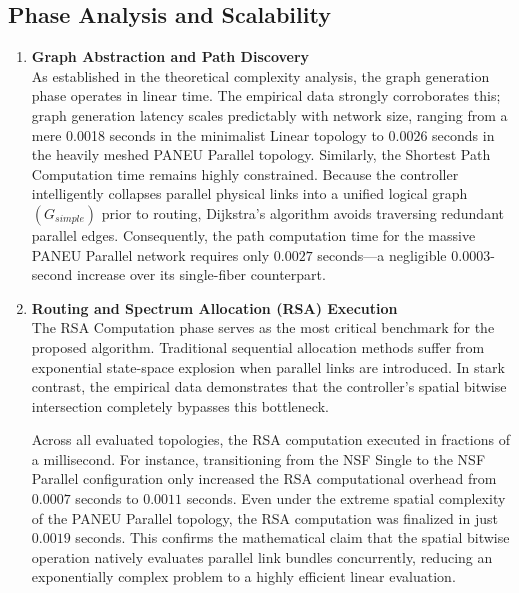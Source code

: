 \subsection*{\small Phase Analysis and Scalability}
\begin{enumerate}
    \item \textbf{Graph Abstraction and Path Discovery} \vspace{0.2cm}\\
          As established in the theoretical complexity analysis, the graph generation phase operates in linear time. The empirical data strongly corroborates this; graph generation latency scales predictably with network size, ranging from a mere 0.0018 seconds in the minimalist Linear topology to $0.0026$ seconds in the heavily meshed PANEU Parallel topology. Similarly, the Shortest Path Computation time remains highly constrained. Because the controller intelligently collapses parallel physical links into a unified logical graph $(G_{simple})$ prior to routing, Dijkstra's algorithm avoids traversing redundant parallel edges. Consequently, the path computation time for the massive PANEU Parallel network requires only $0.0027$ seconds—a negligible $0.0003$-second increase over its single-fiber counterpart.
    \item \textbf{Routing and Spectrum Allocation (RSA) Execution} \vspace{0.2cm}\\
          The RSA Computation phase serves as the most critical benchmark for the proposed algorithm. Traditional sequential allocation methods suffer from exponential state-space explosion when parallel links are introduced. In stark contrast, the empirical data demonstrates that the controller's spatial bitwise intersection completely bypasses this bottleneck.

          Across all evaluated topologies, the RSA computation executed in fractions of a millisecond. For instance, transitioning from the NSF Single to the NSF Parallel configuration only increased the RSA computational overhead from $0.0007$ seconds to $0.0011$ seconds. Even under the extreme spatial complexity of the PANEU Parallel topology, the RSA computation was finalized in just $0.0019$ seconds. This confirms the mathematical claim that the spatial bitwise operation natively evaluates parallel link bundles concurrently, reducing an exponentially complex problem to a highly efficient linear evaluation.
\end{enumerate}
